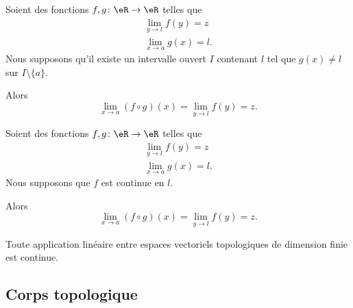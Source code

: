 \begin{proposition}        \label{PROPooFGWXooFjvTYj}
	Soient des fonctions \( f,g\colon \eR\to \eR\) telles que
	\begin{subequations}
		\begin{align}
			\lim_{y\to l} f(y)=z \\
			\lim_{x\to a} g(x)=l.
		\end{align}
	\end{subequations}
	Nous supposons qu'il existe un intervalle ouvert \( I\) contenant \( l\) tel que \( g(x)\neq l\) sur \( I\setminus\{ a \}\).

	Alors
	\begin{equation}
		\lim_{x\to a} (f\circ g)(x)=\lim_{y\to l} f(y)=z.
	\end{equation}
\end{proposition}

\begin{proposition}       \label{PROPooKNVHooXlQyVA}
	Soient des fonctions \( f,g\colon \eR\to \eR\) telles que
	\begin{subequations}
		\begin{align}
			\lim_{y\to l} f(y)=z \\
			\lim_{x\to a} g(x)=l.
		\end{align}
	\end{subequations}
	Nous supposons que \( f\) est continue en \( l\).

	Alors
	\begin{equation}
		\lim_{x\to a} (f\circ g)(x)=\lim_{y\to l} f(y)=z.
	\end{equation}
\end{proposition}

\begin{proposition}     \label{PROPooBEHTooBrLWuh}
	Toute application linéaire entre espaces vectoriels topologiques de dimension finie est continue.
\end{proposition}

\subsection{Corps topologique}

